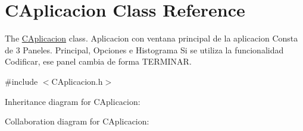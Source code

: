 \hypertarget{classCAplicacion}{}\section{C\+Aplicacion Class Reference}
\label{classCAplicacion}


The \hyperlink{classCAplicacion}{C\+Aplicacion} class. Aplicacion con ventana principal de la aplicacion Consta de 3 Paneles. Principal, Opciones e Histograma Si se utiliza la funcionalidad Codificar, ese panel cambia de forma T\+E\+R\+M\+I\+N\+AR.  




{\ttfamily \#include $<$C\+Aplicacion.\+h$>$}



Inheritance diagram for C\+Aplicacion\+:


Collaboration diagram for C\+Aplicacion\+:
